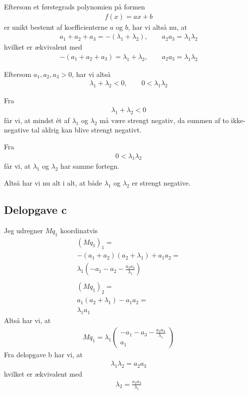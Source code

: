\documentclass[12pt]{article}
\begin{document}
Eftersom et førstegrads polynomien på formen 
\begin{align}
f(x) = ax + b
\end{align}
er unikt bestemt af koefficienterne $a$ og $b$, har vi altså nu, at
\begin{align}
a_1 + a_2 + a_3 = -(\lambda_1 + \lambda_2), \qquad a_2a_3 = \lambda_1\lambda_2
\end{align}
hvilket er ækvivalent med
\begin{align}
-(a_1 + a_2 + a_3) = \lambda_1 + \lambda_2, \qquad a_2a_3 = \lambda_1\lambda_2
\end{align}

Eftersom $a_1, a_2, a_3>0$, har vi altså
\begin{align}
\lambda_1 + \lambda_2 < 0, \qquad 0 < \lambda_1\lambda_2
\end{align}

Fra 
\begin{align}
\lambda_1 + \lambda_2 < 0
\end{align}
får vi, at mindst ét af $\lambda_1$ og $\lambda_2$ må være strengt negativ, da summen af to ikke-negative tal aldrig kan blive strengt negativt. 

Fra
\begin{align}
0 < \lambda_1\lambda_2
\end{align}
får vi, at $\lambda_1$ og $\lambda_2$ har samme fortegn. 

Altså har vi nu alt i alt, at både $\lambda_1$ og $\lambda_2$ er strengt negative.

\subsection{Delopgave c}

Jeg udregner $Mq_1$ koordinatvis
\begin{align}
(Mq_1)_1 = \\ 
-(a_1 + a_2)(a_2 + \lambda_1) + a_1a_2 = \\
\lambda_1(-a_1 - a_2 - \frac{a_2a_3}{\lambda_1})\\ \\
(Mq_1)_2 = \\ 
a_1(a_2 + \lambda_1) - a_1a_2 = \\
\lambda_1a_1
\end{align}
Altså har vi, at 
\begin{align}
Mq_1 = \lambda_1 \begin{pmatrix}
-a_1 - a_3 - \frac{a_2a_3}{\lambda_1}\\
a_1
\end{pmatrix}
\end{align}
Fra delopgave b har vi, at
\begin{align}
\lambda_1\lambda_2 = a_2a_3
\end{align}
hvilket er ækvivalent med
\begin{align}
\lambda_2 = \frac{a_2a_3}{\lambda_1}
\end{align}
\end{document}
